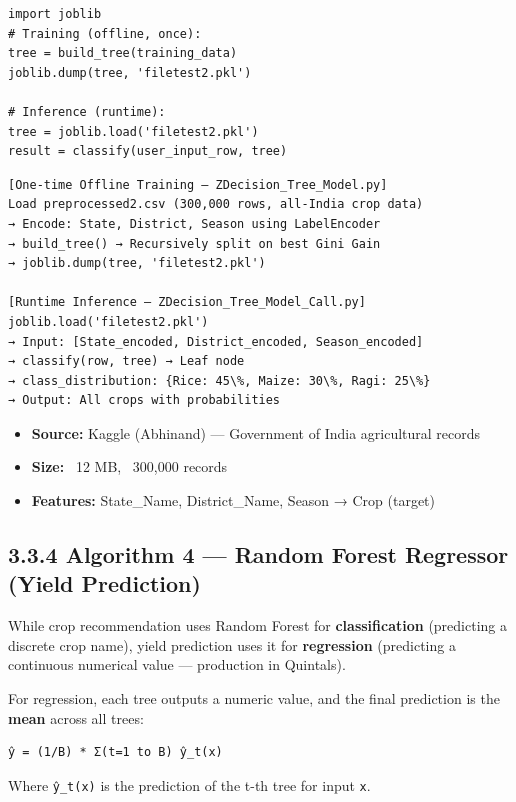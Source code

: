 \documentclass[12pt,a4paper]{report}
\begin{document}
\begin{verbatim}
import joblib
# Training (offline, once):
tree = build_tree(training_data)
joblib.dump(tree, 'filetest2.pkl')

# Inference (runtime):
tree = joblib.load('filetest2.pkl')
result = classify(user_input_row, tree)
\end{verbatim}


\begin{verbatim}
[One-time Offline Training — ZDecision_Tree_Model.py]
Load preprocessed2.csv (300,000 rows, all-India crop data)
→ Encode: State, District, Season using LabelEncoder
→ build_tree() → Recursively split on best Gini Gain
→ joblib.dump(tree, 'filetest2.pkl')

[Runtime Inference — ZDecision_Tree_Model_Call.py]
joblib.load('filetest2.pkl')
→ Input: [State_encoded, District_encoded, Season_encoded]
→ classify(row, tree) → Leaf node
→ class_distribution: {Rice: 45\%, Maize: 30\%, Ragi: 25\%}
→ Output: All crops with probabilities
\end{verbatim}


\begin{itemize}
\item \textbf{Source:} Kaggle (Abhinand) — Government of India agricultural records
\item \textbf{Size:} ~12 MB, ~300,000 records
\item \textbf{Features:} State_Name, District_Name, Season → Crop (target)
\end{itemize}
\newpage

\subsection{3.3.4 Algorithm 4 — Random Forest Regressor (Yield Prediction)}


While crop recommendation uses Random Forest for \textbf{classification} (predicting a discrete crop name), yield prediction uses it for \textbf{regression} (predicting a continuous numerical value — production in Quintals).

For regression, each tree outputs a numeric value, and the final prediction is the \textbf{mean} across all trees:

\begin{verbatim}
ŷ = (1/B) * Σ(t=1 to B) ŷ_t(x)
\end{verbatim}

Where \texttt{ŷ\_t(x)} is the prediction of the t-th tree for input \texttt{x}.
\end{document}
